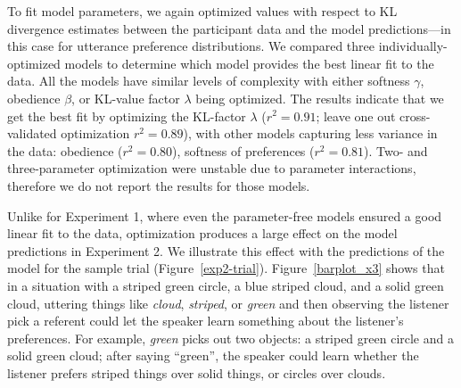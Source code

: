 \documentclass[10pt,a4paper]{article}
\begin{document}


To fit model parameters, we again optimized values with respect to KL divergence estimates between the participant data and the model predictions---in this case for utterance preference distributions.  We compared three individually-optimized models to determine which model provides the best linear fit to the data. All the models have similar levels of complexity with either softness $\gamma$, obedience $\beta$, or KL-value factor $\lambda$ being optimized. The results indicate that we get the best fit by optimizing the KL-factor $\lambda$ ($r^{2}=0.91$; leave one out cross-validated optimization $r^{2}=0.89$), with other models capturing less variance in the data: obedience ($r^{2}=0.80$), softness of preferences ($r^{2}=0.81$). Two- and three-parameter optimization were unstable due to parameter interactions, therefore we do not report the results for those models.

Unlike for Experiment 1, where even the parameter-free models ensured a good linear fit to the data, optimization produces a large effect on the model predictions in Experiment 2. We illustrate this effect with the predictions of the model for the sample trial (Figure~\ref{exp2-trial}). Figure~\ref{barplot_x3} shows that in a situation with a striped green circle, a blue striped cloud, and a solid green cloud, uttering things like \textit{cloud}, \textit{striped}, or \textit{green} and then observing the listener pick a referent could let the speaker learn something about the listener's preferences. For example, \textit{green} picks out two objects: a striped green circle and a solid green cloud; after saying ``green'', the speaker could learn whether the listener prefers striped things over solid things, or circles over clouds.
\end{document}

